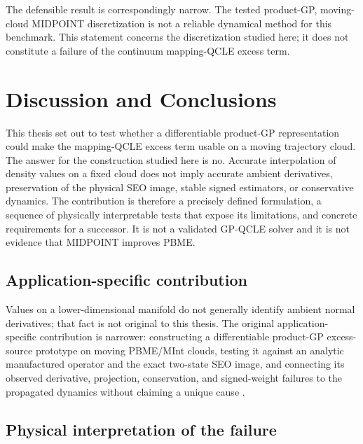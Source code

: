 \documentclass[
  11pt,
  letterpaper,
  onehalfspacing,
  normalmargins,
  equalmargins,
  oneside
]{ut-thesis}
\begin{document}
The defensible result is correspondingly narrow. The tested product-GP,
moving-cloud MIDPOINT discretization is not a reliable dynamical method for
this benchmark. This statement concerns the discretization studied here; it
does not constitute a failure of the continuum mapping-QCLE excess term.

\chapter{Discussion and Conclusions}
\label{chap:discussion-outlook}

This thesis set out to test whether a differentiable product-GP representation
could make the mapping-QCLE excess term usable on a moving trajectory cloud.
The answer for the construction studied here is no. Accurate interpolation of
density values on a fixed cloud does not imply accurate ambient derivatives,
preservation of the physical SEO image, stable signed estimators, or
conservative dynamics. The contribution is therefore a precisely defined
formulation, a sequence of physically interpretable tests that expose its
limitations, and concrete requirements for a successor. It is not a validated
GP-QCLE solver and it is not evidence that MIDPOINT improves PBME.

\section{Application-specific contribution}
\label{sec:discussion-contribution}

Values on a lower-dimensional manifold do not generally identify ambient
normal derivatives; that fact is not original to this thesis. The original
application-specific contribution is narrower: constructing a differentiable
product-GP excess-source prototype on moving PBME/MInt clouds, testing it
against an analytic manufactured operator and the exact two-state SEO image,
and connecting its observed derivative, projection, conservation, and
signed-weight failures to the propagated dynamics without claiming a unique
cause
\cite{Kim2008JCP,Kelly2012JCP,Raissi2017LinearGP,
Solak2002DerivativeGP,CockayneOatesSullivanGirolami2019}.

\section{Physical interpretation of the failure}
\label{sec:discussion-evidence}
\end{document}
